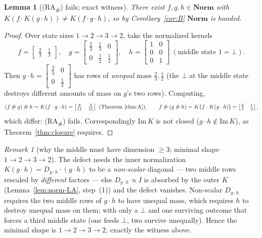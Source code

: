 \documentclass[11pt]{amsart}
\theoremstyle{plain}
\newtheorem{lemma}[theorem]{Lemma}
\theoremstyle{definition}
\theoremstyle{remark}
\newtheorem{remark}[theorem]{Remark}
\newcommand{\Norm}{\mathbf{Norm}}
\newcommand{\Img}{\mathrm{Im}\,}
\newcommand{\sh}{\mathbin{\#}}
\newcommand{\RA}{\textsf{(RA}\textsubscript{\#}\textsf{)}}
\begin{document}
\begin{lemma}[\RA{} fails; exact witness]
\label{lem:norm-RA}
There exist $f,g,h\in\Norm$ with $K(f\cdot K(g\cdot h))\ne K(f\cdot g\cdot h)$, so by
Corollary~\ref{cor:B} $\Norm$ is handed.
\end{lemma}
\begin{proof}
Over state sizes $1\to 2\to 3\to 2$, take the normalized kernels
\[
  f=\begin{bmatrix}\tfrac23 & \tfrac13\end{bmatrix},\quad
  g=\begin{bmatrix}\tfrac23 & \tfrac13 & 0\\[2pt] 0 & \tfrac12 & \tfrac12\end{bmatrix},\quad
  h=\begin{bmatrix}1&0\\0&0\\0&1\end{bmatrix}\ (\text{middle state }1=\bot).
\]
Then $g\cdot h=\left[\begin{smallmatrix}\tfrac23&0\\0&\tfrac12\end{smallmatrix}\right]$ has rows of
\emph{unequal} mass $\tfrac23,\tfrac12$ (the $\bot$ at the middle state destroys different amounts of
mass on $g$'s two rows). Computing,
\[
  (f\sh g)\sh h = K(f\cdot g\cdot h) = \begin{bmatrix}\tfrac{8}{11}&\tfrac{3}{11}\end{bmatrix}
    \ (\text{Theorem~\ref{thm:A}}),\qquad
  f\sh(g\sh h) = K\big(f\cdot K(g\cdot h)\big) = \begin{bmatrix}\tfrac23&\tfrac13\end{bmatrix},
\]
which differ: \RA{} fails. Correspondingly $\Img K$ is not closed ($g\cdot h\notin\Img K$), as
Theorem~\ref{thm:closure} requires.
\end{proof}

\begin{remark}[why the middle must have dimension $\ge 3$; minimal shape $1\to2\to3\to2$]
\label{rem:dim3}
The defect needs the inner normalization $K(g\cdot h)=D_{g\cdot h}\cdot(g\cdot h)$ to be a
\emph{non-scalar} diagonal --- two middle rows rescaled by \emph{different} factors --- else
$D_{g\cdot h}\propto I$ is absorbed by the outer $K$ (Lemma~\ref{lem:norm-LA}, step~(1)) and the
defect vanishes. Non-scalar $D_{g\cdot h}$ requires the two middle rows of $g\cdot h$ to have unequal
mass, which requires $h$ to destroy unequal mass on them; with only a $\bot$ and one surviving
outcome that forces a third middle state (one feeds $\bot$, two survive unequally). Hence the minimal
shape is $1\to2\to3\to2$, exactly the witness above.
\end{remark}
\end{document}
